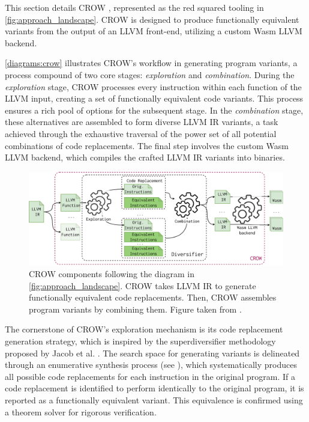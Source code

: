 
\label{section:crow}
\renewcommand{\tool}{CROW\xspace}

This section details CROW \cite{CROW}, represented as the red squared tooling in \autoref{fig:approach_landscape}. 
CROW is designed to produce functionally equivalent \wasm variants from the output of an LLVM front-end, utilizing a custom Wasm LLVM backend.

\autoref{diagrams:crow} illustrates CROW's workflow in generating program variants, a process compound of two core stages: \textit{exploration} and \textit{combination}. 
During the \textit{exploration} stage, CROW processes every instruction within each function of the LLVM input, creating a set of functionally equivalent code variants. 
This process ensures a rich pool of options for the subsequent stage.
In the \textit{combination} stage, these alternatives are assembled to form diverse LLVM IR variants, a task achieved through the exhaustive traversal of the power set of all potential combinations of code replacements. 
The final step involves the custom Wasm LLVM backend, which compiles the crafted LLVM IR variants into \wasm binaries. 


\begin{figure}[h]
    \includegraphics[width=\linewidth]{diagrams/generation/crow.drawio.pdf}
    \caption{CROW components following the diagram in \autoref{fig:approach_landscape}. CROW takes LLVM IR to generate functionally equivalent code replacements. Then, CROW assembles program variants by combining them. Figure taken from \cite{Lic}.}
    \label{diagrams:crow}
\end{figure}



The cornerstone of CROW's exploration mechanism is its code replacement generation strategy, which is inspired by the superdiversifier methodology proposed by Jacob et al. \cite{jacob2008superdiversifier}. 
The search space for generating variants is delineated through an enumerative synthesis process (see ), which systematically produces all possible code replacements for each instruction in the original program. 
If a code replacement is identified to perform identically to the original program, it is reported as a functionally equivalent variant.
This equivalence is confirmed using a theorem solver for rigorous verification.

